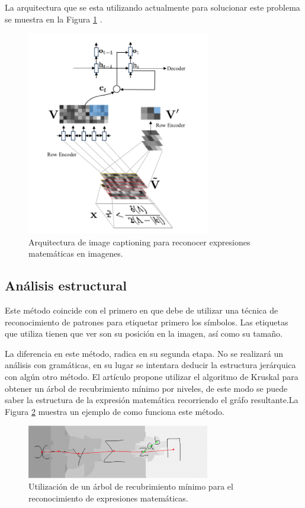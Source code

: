     La arquitectura que se esta utilizando actualmente para solucionar este problema se muestra en la Figura \ref{fig:imgcaptioning} \cite{imagetolatex}\cite{imagemarkup}\cite{chino}.
    
    \begin{figure}
		\centering
		\includegraphics[width=8cm]{capitulo2/images/imgcaptioning}
		\caption{Arquitectura de image captioning para reconocer expresiones matemáticas en imagenes.}
		\label{fig:imgcaptioning}
    \end{figure}

\subsection{Análisis estructural}

Este método coincide con el primero en que debe de utilizar una técnica de reconocimiento de patrones para etiquetar primero los símbolos. Las etiquetas que utiliza tienen que ver son su posición en la imagen, así como su tamaño. 

La diferencia en este método, radica en su segunda etapa. No se realizará un análisis con gramáticas, en su lugar se intentara deducir la estructura jerárquica con algún otro método. El artículo \cite{spanningtree} propone utilizar el algoritmo de Kruskal para obtener un árbol de recubrimiento mínimo por niveles, de este modo se puede saber la estructura de la expresión matemática recorriendo el gráfo resultante.La Figura \ref{fig:spanningtree} muestra un ejemplo de como funciona este método.

\begin{figure}[h]
	\centering
	\includegraphics[width=8cm]{capitulo2/images/spanningtree}
	\caption{Utilización de un árbol de recubrimiento mínimo para el reconocimiento de expresiones matemáticas.}
	\label{fig:spanningtree}
\end{figure}
\newpage
